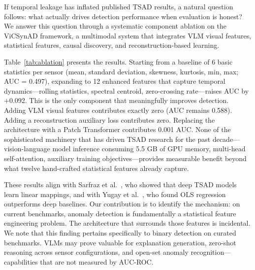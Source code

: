 \documentclass[preprint,12pt]{elsarticle}
\begin{document}
If temporal leakage has inflated published TSAD results, a natural question follows: what actually drives detection performance when evaluation is honest? We answer this question through a systematic component ablation on the ViCSynAD framework, a multimodal system that integrates VLM visual features, statistical features, causal discovery, and reconstruction-based learning.

Table~\ref{tab:ablation} presents the results. Starting from a baseline of 6 basic statistics per sensor (mean, standard deviation, skewness, kurtosis, min, max; AUC = 0.497), expanding to 12 enhanced features that capture temporal dynamics---rolling statistics, spectral centroid, zero-crossing rate---raises AUC by $+$0.092. This is the only component that meaningfully improves detection. Adding VLM visual features contributes exactly zero (AUC remains 0.588). Adding a reconstruction auxiliary loss contributes zero. Replacing the architecture with a Patch Transformer contributes 0.001 AUC. None of the sophisticated machinery that has driven TSAD research for the past decade---vision-language model inference consuming 5.5 GB of GPU memory, multi-head self-attention, auxiliary training objectives---provides measurable benefit beyond what twelve hand-crafted statistical features already capture.

These results align with Sarfraz et al.\ \cite{sarfraz2024position}, who showed that deep TSAD models learn linear mappings, and with Yugay et al.\ \cite{yugay2025strong}, who found OLS regression outperforms deep baselines. Our contribution is to identify the mechanism: on current benchmarks, anomaly detection is fundamentally a statistical feature engineering problem. The architecture that surrounds those features is incidental. We note that this finding pertains specifically to binary detection on curated benchmarks. VLMs may prove valuable for explanation generation, zero-shot reasoning across sensor configurations, and open-set anomaly recognition---capabilities that are not measured by AUC-ROC.

\begin{table}[htbp]
\centering
\small\setlength{\tabcolsep}{6pt}
\caption{Component ablation under temporal split (SWaT, 2,000 windows).}
\label{tab:ablation}
\end{table}
\end{document}
